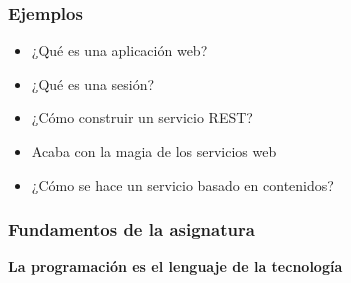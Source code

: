 \begin{frame}
\frametitle{Ejemplos}

{\Large
\begin{itemize}
  \item ¿Qué es una aplicación web?
  \item ¿Qué es una sesión?
  \item ¿Cómo construir un servicio REST?
  \item Acaba con la magia de los servicios web
  \item ¿Cómo se hace un servicio basado en contenidos?
\end{itemize}
}
\end{frame}


\begin{frame}
\frametitle{Fundamentos de la asignatura}

\vspace{3.8cm}

\begin{center}
\color{red}
\Huge {\bf La programación es el lenguaje de la tecnología}
\end{center}

\end{frame}
\usebackgroundtemplate{}


